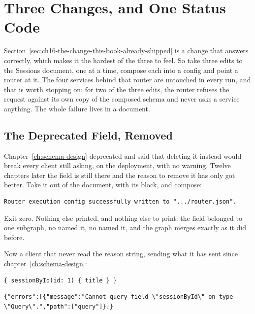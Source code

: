 \section{Three Changes, and One Status Code}
\label{sec:ch16-three-changes-and-one-status-code}

%
Section~\ref{sec:ch16-the-change-this-book-already-shipped} is a change that
answers correctly, which makes it the hardest of the three to feel. So take
three edits to the Sessions document, one at a time, compose each into a
config and point a router at it. The four services behind that router are
untouched in every run, and that is worth stopping on: for two of the three
edits, the router refuses the request against its own copy of the composed
schema and never asks a service anything. The whole failure lives in a
document.

\subsection{The Deprecated Field, Removed}

%
Chapter~\ref{ch:schema-design} deprecated  and said that
deleting it instead would break every client still asking, on the deployment,
with no warning. Twelve chapters later the field is still there and the reason
to remove it has only got better. Take it out of the document, with its
 block, and compose:

\begin{verbatim}
Router execution config successfully written to ".../router.json".
\end{verbatim}

%
Exit zero. Nothing else printed, and nothing else to print: the field belonged
to one subgraph, no  named it, no  named it, and
the graph merges exactly as it did before.

%
Now a client that never read the reason string, sending what it has sent since
chapter~\ref{ch:schema-design}:

\begin{verbatim}
{ sessionById(id: 1) { title } }
\end{verbatim}

\begin{verbatim}
{"errors":[{"message":"Cannot query field \"sessionById\" on type \"Query\".","path":["query"]}]}
\end{verbatim}

